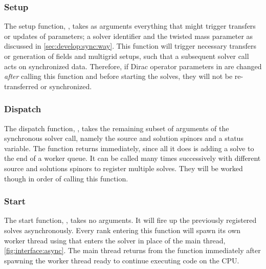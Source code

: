 \subsubsection{Setup}

The setup function, , takes as arguments everything that might trigger transfers or updates of parameters; a solver identifier and the twisted mass parameter as discussed in \cref{sec:develop:sync:way}.
This function will trigger necessary transfers or generation of fields and multigrid setups, such that a subsequent solver call acts on synchronized data.
Therefore, if Dirac operator parameters in \openqxd are changed \emph{after} calling this function and before starting the solves, they will not be re-transferred or synchronized.

\subsubsection{Dispatch}

The dispatch function, , takes the remaining subset of arguments of the synchronous solver call, namely the source and solution spinors and a status variable.
The function returns immediately, since all it does is adding a solve to the end of a worker queue.
It can be called many times successively with different source and solutions spinors to register multiple solves.
They will be worked though in order of calling this function.

\subsubsection{Start}
\label{sec:interface:solver:async:start}

The start function, , takes no arguments.
It will fire up the previously registered solves asynchronously.
Every rank entering this function will spawn its own worker thread using  that enters the \quda solver in place of the main thread, \cref{fig:interface:async}.
The main thread returns from the function immediately after spawning the worker thread ready to continue executing code on the CPU.


